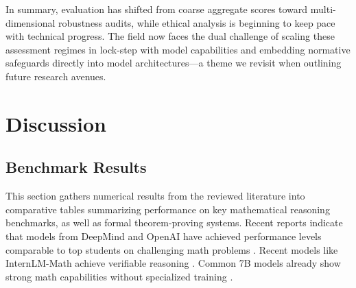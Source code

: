 \documentclass[acmsmall,anonymous]{acmart}
\begin{document}
\bigskip
In summary, evaluation has shifted from coarse aggregate scores toward multi-dimensional robustness audits, while ethical analysis is beginning to keep pace with technical progress.  The field now faces the dual challenge of scaling these assessment regimes in lock-step with model capabilities and embedding normative safeguards directly into model architectures—a theme we revisit when outlining future research avenues.


\section{Discussion}\label{sec:benchmarks}
\subsection{Benchmark Results}

This section gathers numerical results from the reviewed literature into
comparative tables summarizing performance on key mathematical reasoning benchmarks, as well as formal theorem-proving systems. Recent reports indicate that models from DeepMind and OpenAI have achieved performance levels comparable to top students on challenging math problems \cite{gibney2025deepmindopenai,anonymous2025deepmindopenai}. Recent models like InternLM-Math achieve verifiable reasoning \cite{ying2024 b internlm}. Common 7B models already show strong math capabilities without specialized training \cite{li2024a common}.

\end{document}
